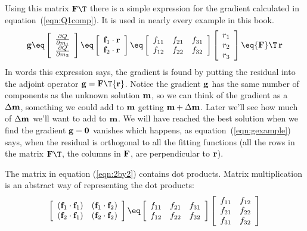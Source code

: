 Using this matrix ${\bold F\T}$ there is a simple expression
for the gradient calculated in equation~(\ref{eqn:Q1comp}).
It is used in nearly every example in this book.
%
\begin{equation}
\bold g \eq 
\left[
\begin{array}{c}
\frac{\partial Q}{\partial m_1} \\
\frac{\partial Q}{\partial m_2}
\end{array}
\right]
\eq
\left[
\begin{array}{c}
{\bf f}_1 \cdot {\bf r} \\
{\bf f}_2 \cdot {\bf r}
\end{array}
\right]
\eq
\left[ 
\begin{array}{ccc}
  f_{11} & f_{21}  & f_{31} \\
  f_{12} & f_{22}  & f_{32}
 \end{array} \right] 
\left[
\begin{array}{c}
r_1 \\
r_2 \\
r_3
\end{array}
\right]
\eq
{\bf F}\T\,{\bf r}
\label{eqn:gexample}
\end{equation}
%
In words this expression says, the gradient is found by putting the residual into the adjoint operator ${\bf g} = {\bf F}\T {\bf r}$. Notice the gradient ${\bf g}$ has the same number of components as the unknown solution ${\bf m}$, so we can think of the gradient as a $\Delta {\bf m}$, something we could add to ${\bf m}$ getting ${\bf m}  + \Delta {\bf m}$.  Later we'll see how much of $\Delta {\bf m}$ we'll want to add to ${\bf m}$.  We will have reached the best solution when we find the gradient ${\bf g} = {\bf 0}$ vanishes which happens, as equation~(\ref{eqn:gexample}) says, when the residual is orthogonal to all the fitting functions (all the rows in the matrix ${\bf F}\T$, the columns in ${\bf F}$, are perpendicular  to ${\bf r}$). 
\par
The matrix in equation (\ref{eqn:2by2})
contains dot products.
Matrix multiplication is an abstract way of representing the dot products:
\begin{equation}
\left[ 
\begin{array}{ccc}
  (\ff_1 \cdot \ff_1) & (\ff_1 \cdot \ff_2)  \\
  (\ff_2 \cdot \ff_1) & (\ff_2 \cdot \ff_2)  \end{array} \right] 
 \eq
\left[ 
\begin{array}{ccc}
  f_{11} & f_{21} & f_{31}  \\
  f_{12} & f_{22} & f_{32}  \end{array} \right] 
\left[ 
\begin{array}{ccc}
  f_{11} & f_{12}  \\
  f_{21} & f_{22}  \\
  f_{31} & f_{32}  \end{array} \right] 
\label{eqn:covmat}
\end{equation}
